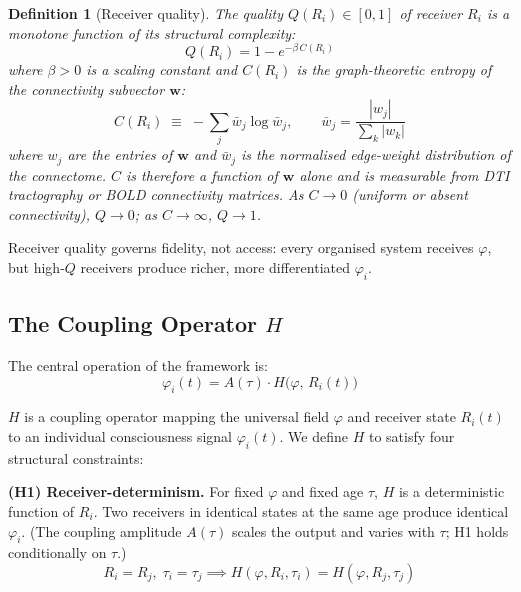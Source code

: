 \documentclass[12pt]{article}
\newtheorem{definition}{Definition}
\begin{document}
\begin{definition}[Receiver quality]
The quality $Q(R_i) \in [0, 1]$ of receiver $R_i$ is a monotone function of its structural complexity:
\begin{equation}
    Q(R_i) = 1 - e^{-\beta \, C(R_i)}
\end{equation}
where $\beta > 0$ is a scaling constant and $C(R_i)$ is the graph-theoretic entropy of the connectivity subvector $\mathbf{w}$:
\begin{equation}
    C(R_i) \;\equiv\; -\sum_{j} \bar{w}_j \log \bar{w}_j, \qquad
    \bar{w}_j = \frac{|w_j|}{\sum_k |w_k|}
\end{equation}
where $w_j$ are the entries of $\mathbf{w}$ and $\bar{w}_j$ is the normalised edge-weight distribution of the connectome. $C$ is therefore a function of $\mathbf{w}$ alone and is measurable from DTI tractography or BOLD connectivity matrices. As $C \to 0$ (uniform or absent connectivity), $Q \to 0$; as $C \to \infty$, $Q \to 1$.
\end{definition}

Receiver quality governs fidelity, not access: every organised system receives $\varphi$, but high-$Q$ receivers produce richer, more differentiated $\varphi_i$.

\subsection{The Coupling Operator \texorpdfstring{$H$}{H}}

The central operation of the framework is:
\begin{equation}
    \varphi_i(t) = A(\tau)\cdot H\!\bigl(\varphi,\, R_i(t)\bigr)
\end{equation}

$H$ is a coupling operator mapping the universal field $\varphi$ and receiver state $R_i(t)$ to an individual consciousness signal $\varphi_i(t)$. We define $H$ to satisfy four structural constraints:

\textbf{(H1) Receiver-determinism.} For fixed $\varphi$ and fixed age $\tau$, $H$ is a deterministic function of $R_i$. Two receivers in identical states at the same age produce identical $\varphi_i$. (The coupling amplitude $A(\tau)$ scales the output and varies with $\tau$; H1 holds conditionally on $\tau$.)
\begin{equation}
    R_i = R_j,\;\tau_i = \tau_j \implies H(\varphi, R_i, \tau_i) = H(\varphi, R_j, \tau_j)
\end{equation}
\end{document}
